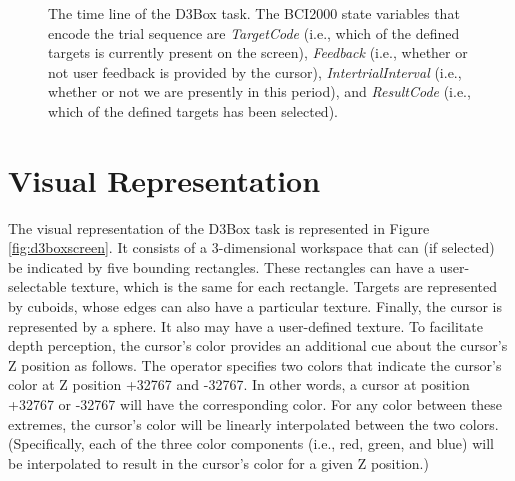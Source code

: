 \documentclass[letterpaper,oneside,12pt]{article}
\begin{document}
\begin{figure}[ht]
 \centerline{}
 \caption{The time line of the D3Box task. The BCI2000 state variables
          that encode the trial sequence are \emph{TargetCode} (i.e., which
          of the defined targets is currently present on the screen),
          \emph{Feedback} (i.e., whether or not user feedback
          is provided by the cursor), \emph{IntertrialInterval} 
          (i.e., whether or not we are presently in this period), 
          and \emph{ResultCode} (i.e., which of the defined targets 
          has been selected).}
 \label{fig:timeline}
\end{figure}

\section{Visual Representation}

The visual representation of the D3Box task is represented in Figure 
\ref{fig:d3boxscreen}. It consists of a 3-dimensional workspace that can (if 
selected) be indicated by five bounding rectangles. These rectangles can have a 
user-selectable texture, which is the same for each rectangle. Targets are 
represented by cuboids, whose edges can also have a particular texture. 
Finally, the cursor is represented by a sphere. It also may have a user-defined 
texture. To facilitate depth perception, the cursor's color provides an 
additional cue about the cursor's Z position as follows. The operator specifies 
two colors that indicate the cursor's color at Z position +32767 and -32767. In 
other words, a cursor at position +32767 or -32767 will have the corresponding 
color. For any color between these extremes, the cursor's color will be linearly 
interpolated between the two colors. (Specifically, each of the three color 
components (i.e., red, green, and blue) will be interpolated to result in the 
cursor's color for a given Z position.)
\end{document}
